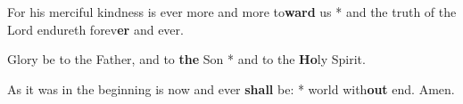 \begin{multicols}{2}
	For his merciful kindness is ever more and more to\textbf{ward} us * and the truth of the Lord endureth forev\textbf{er} and ever.
	
	Glory be to the Father, and to \textbf{the} Son * and to the \textbf{Ho}ly Spirit.
	
	As it was in the beginning is now and ever \textbf{shall} be: * world with\textbf{out} end. Amen.
\end{multicols}